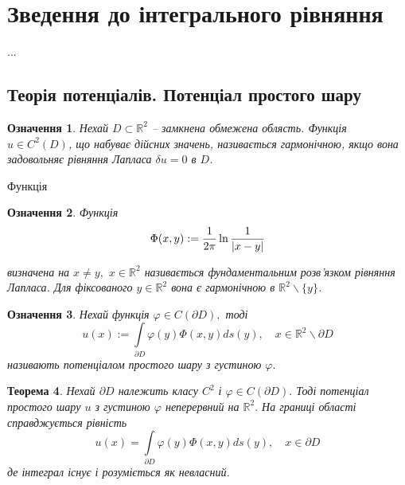 \documentclass[14pt,a4paper]{extarticle}
\newcounter{e}
\newtheorem{theorem}{Теорема}[section]
\newtheorem{defn}[theorem]{Означення}
\numberwithin{equation}{section}
\newcommand{\intl}{\int\limits}
\begin{document}
 \newpage
 \thispagestyle{empty}
 \section{Зведення до інтегрального рівняння}
 ...
 \subsection{Теорія потенціалів. Потенціал простого шару}

\begin{defn}
	\label{harminic-func}
	Нехай $D \subset \mathbb{R}^2$ -- замкнена обмежена облясть. Функція $u \in C^2(D)$, що набуває дійсних значень, називається гармонічною, якщо вона задовольняє рівняння Лапласа $\delta u = 0$ в $D$.
\end{defn}

Функція
	\label{fundamental-solution-defn}

\begin{defn}
	 \label{fundamental-solution}  
	 Функція
	\begin{equation}
		 \Phi(x, y) := \frac{1}{2\pi} \ln \frac{1}{\abs{x - y}} 
	\end{equation}
	
	 визначена на  $x \neq y,$ $x \in \mathbb{R}^2$ називається фундаментальним розв'язком рівняння Лапласа. Для фіксованого $y \in \mathbb{R}^2$ вона є гармонічною в $\mathbb{R}^2 \backslash \{y\}$.
\end{defn}
  
 \begin{defn}
	\label{single-layer-potential}
	 Нехай функція $\varphi \in C(\partial D),$ тоді
	 \begin{equation}
		 u(x):=\intl_{\partial D} \varphi(y) \Phi(x, y) d s(y), \quad x \in \mathbb{R}^{2} \backslash \partial D
	 \end{equation}
	 називають потенціалом простого шару з густиною $\varphi .$
 \end{defn}

\begin{theorem}
 	\label{potential-on-bound} 
	 Нехай $\partial D$ належить класу $C^{2}$ і $\varphi \in C(\partial D) .$ Тоді потенціал простого шару $u$ з густиною $\varphi$ неперервний на $\mathbb{R}^{2} .$ На границі області справджується рівність
	 \begin{equation}
		 u(x)=\intl_{\partial D} \varphi(y) \Phi(x, y) d s(y), \quad x \in \partial D
	 \end{equation}
	 де інтеграл існує і розуміється як невласний.
\end{theorem}
 
\end{document}
